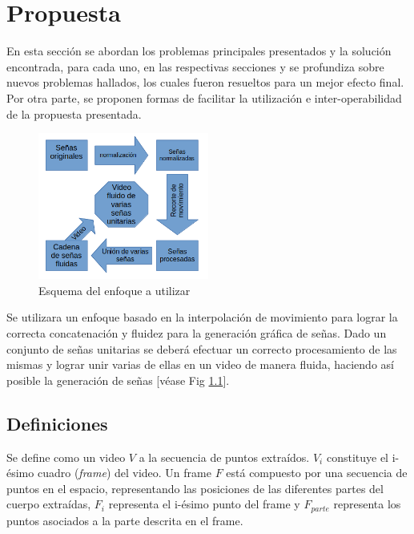 \chapter{Propuesta}\label{chapter:proposal}
En esta sección se abordan los problemas principales presentados y la solución encontrada, para cada uno, en las respectivas secciones y se profundiza sobre nuevos problemas hallados, los cuales fueron resueltos para un mejor efecto final. Por otra parte, se proponen formas de facilitar la utilización e inter-operabilidad de la propuesta presentada. 


\begin{figure}[ht!]
\centering
\includegraphics[width=0.5\textwidth]{./Graphics/esquema}
\caption{Esquema del enfoque a utilizar}
\label{f:enfoque_esquema}
\end{figure}

Se utilizara un enfoque basado en la interpolación de movimiento para lograr la correcta concatenación y fluidez para la generación gráfica de señas. Dado un conjunto de señas unitarias se deberá efectuar un correcto procesamiento de las mismas y lograr unir varias de ellas en un video de manera fluida, haciendo así posible la generación de señas [véase Fig \ref{f:enfoque_esquema}]. 



\section{Definiciones}

Se define como un video $V$ a la secuencia de puntos extraídos. $V_i$
constituye el i-ésimo cuadro (\emph{frame}) del video. Un frame $F$ está compuesto por una secuencia
de puntos en el espacio, representando las posiciones de las diferentes partes del cuerpo extraídas,
$F_i$ representa el i-ésimo punto del frame y $F_{parte}$ representa los puntos asociados a la parte 
descrita en el frame. 

